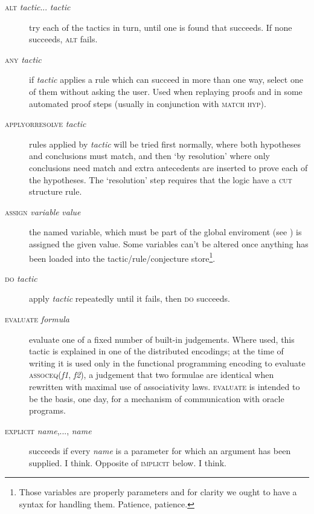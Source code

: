 \begin{description}
\item[\textsc{alt} \textit{tactic}... \textit{tactic}] try each of the tactics in turn, until one is found that succeeds. If none succeeds, \textsc{alt} fails.

\item [\textsc{any} \textit{tactic}] if \textit{tactic} applies a rule which can succeed in more than one way, select one of them without asking the user. Used when replaying proofs and in some automated proof steps (usually in conjunction with \textsc{match hyp}).

\item [\textsc{applyorresolve} \textit{tactic}] rules applied by \textit{tactic} will be tried first normally, where both hypotheses and conclusions must match, and then `by resolution' where only conclusions need match and extra antecedents are inserted to prove each of the hypotheses. The `resolution' step requires that the logic have a \textsc{cut} structure rule.


\item [\textsc{assign} \textit{variable} \textit{value}] the named variable, which must be part of the global enviroment (see ) is assigned the given value. Some variables can't be altered once anything has been loaded into the tactic/rule/conjecture store\footnote{Those variables are properly parameters and for clarity we ought to have a syntax for handling them. Patience, patience.}.


\item [\textsc{do} \textit{tactic}] apply \textit{tactic} repeatedly until it fails, then \textsc{do} succeeds.


\item [\textsc{evaluate} \textit{formula} ] evaluate one of a fixed number of built-in judgements. Where used, this tactic is explained in one of the distributed encodings; at the time of writing it is used only in the functional programming encoding to evaluate \textsc{assoceq}(\textit{f1}, \textit{f2}), a judgement that two formulae are identical when rewritten with maximal use of associativity laws. \textsc{evaluate} is intended to be the basis, one day, for a mechanism of communication with oracle programs.


\item [\textsc{explicit} \textit{name},..., \textit{name}] succeeds if every \textit{name} is a parameter for which an argument has been supplied. I think. Opposite of \textsc{implicit} below. I think.



\end{description}
